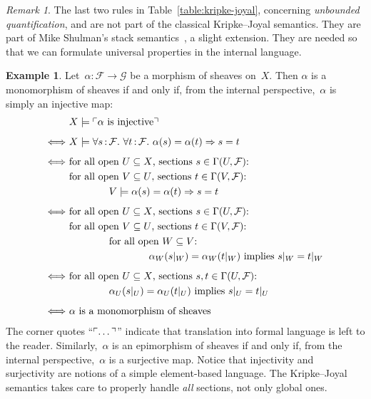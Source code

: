 \documentclass[10pt]{amsart}
\theoremstyle{definition}
\newtheorem{ex}[defn]{Example}
\theoremstyle{plain}
\theoremstyle{remark}
\newtheorem{rem}[defn]{Remark}
\newcommand{\F}{\mathcal{F}}
\renewcommand{\G}{\mathcal{G}}
\newcommand{\?}{\,{:}\,}
\renewcommand{\_}{\mathpunct{.}\,}
\newcommand{\speak}[1]{\ulcorner\text{\textnormal{#1}}\urcorner}
\begin{document}
\begin{rem}The last two rules in Table~\ref{table:kripke-joyal}, concerning
\emph{unbounded quantification}, and are not part of the classical Kripke--Joyal
semantics. They are part of Mike Shulman's stack semantics~\cite{shulman:stack},
a slight extension. They are needed so that we can formulate universal
properties in the internal language.
\end{rem}

\begin{ex}\label{ex:injective-surjective}
Let~$\alpha : \F \to \G$ be a morphism of sheaves on~$X$. Then
$\alpha$ is a monomorphism of sheaves if and only if, from the internal
perspective,~$\alpha$ is simply an injective map:
\allowdisplaybreaks
\begin{align*}
  & X \models \speak{$\alpha$ is injective} \\[0.5em]
  \Longleftrightarrow\
  & X \models \forall s\?\F\_ \forall t\?\F\_ \alpha(s) = \alpha(t) \Rightarrow s = t \\[0.5em]
  \Longleftrightarrow\ &
    \text{for all open~$U \subseteq X$, sections $s \in \Gamma(U, \F)$:} \\
  & \text{for all open~$V \subseteq U$, sections $t \in \Gamma(V, \F)$:} \\
  &\qquad\qquad
      V \models \alpha(s) = \alpha(t) \Rightarrow s = t \\[0.5em]
  \Longleftrightarrow\ &
    \text{for all open~$U \subseteq X$, sections $s \in \Gamma(U, \F)$:} \\
  & \text{for all open~$V \subseteq U$, sections $t \in \Gamma(V, \F)$:} \\
  &\qquad\qquad
      \text{for all open~$W \subseteq V$:} \\
  &\qquad\qquad\qquad\qquad
        \text{$\alpha_W(s|_W) = \alpha_W(t|_W)$ implies $s|_W = t|_W$} \\[0.5em]
  \Longleftrightarrow\ &
    \text{for all open~$U \subseteq X$, sections $s, t \in \Gamma(U, \F)$:} \\
  &\qquad\qquad
        \text{$\alpha_U(s|_U) = \alpha_U(t|_U)$ implies $s|_U = t|_U$} \\[0.5em]
  \Longleftrightarrow\ &
    \text{$\alpha$ is a monomorphism of sheaves}
\end{align*}
The corner quotes ``$\speak{\ldots}$'' indicate that translation into formal
language is left to the reader. Similarly,~$\alpha$ is an epimorphism of
sheaves if and only if, from the internal perspective,~$\alpha$ is a
surjective map. Notice that injectivity and surjectivity are
notions of a simple element-based language. The Kripke--Joyal semantics
takes care to properly handle \emph{all} sections, not only global ones.
\end{ex}
\end{document}
